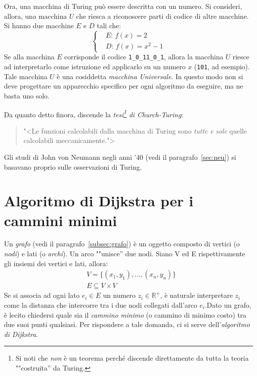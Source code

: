 Ora, una macchina di Turing può essere descritta con un numero. Si consideri, allora, una macchina $U$ che riesca a riconoscere parti di codice di altre macchine. Si hanno due macchine $E$ e $D$ tali che:
\[
\left\{
	\begin{aligned}
&E:\,f(x)=2 		\\
&D:\,f(x)=x^2-1
	\end{aligned}
\right.
\]
Se alla macchina $E$ corrisponde il codice \lstinline!1_0_11_0_1!, allora la macchina $U$ riesce ad interpretarlo come istruzione ed applicarlo su un numero $x$ (\lstinline!101!, ad esempio). Tale macchina $U$ è una cosiddetta \emph{macchina Universale}. In questo modo non si deve progettare un apparecchio specifico per ogni algoritmo da eseguire, ma ne basta uno solo. 

Da  quanto detto finora, discende la \emph{tesi\footnote{Si noti che \emph{non} è un teorema perché discende direttamente da tutta la teoria ""costruita'' da Turing.} di Church-Turing}:
\begin{quotation}
"<Le funzioni calcolabili dalla macchina di Turing sono \emph{tutte e sole} quelle calcolabili meccanicamente.">
\end{quotation}
Gli studi di John von Neumann negli anni '40 (vedi il paragrafo~\vref{sec:neu}) si basavano proprio sulle osservazioni di Turing.

	\section{Algoritmo di Dijkstra per i cammini minimi}
Un \emph{grafo} (vedi il paragrafo~\vref{subsec:grafo}) è un oggetto composto di vertici (o \emph{nodi}) e lati (o \emph{archi}). Un arco ""unisce'' due nodi. Siano V ed E rispettivamente gli insiemi dei vertici e lati, allora:
\[
\begin{split}
&V=\{(x_1,y_1),\dots,(x_n,y_n)\} \\
&E\subseteq V\times V
\end{split}
\]
Se si associa ad ogni lato $e_{i}\in E$ un numero $z_i\in\mathbb{R^{+}}$, è naturale interpretare $z_i$ come la distanza che intercorre tra i due nodi collegati dall'arco $e_i$.Dato un grafo, è lecito chiedersi quale sia il \emph{cammino minimo} (o cammino di minimo costo) tra due suoi punti qualsiasi. Per rispondere a tale domanda, ci si serve dell'{\em algoritmo di Dijkstra}.

